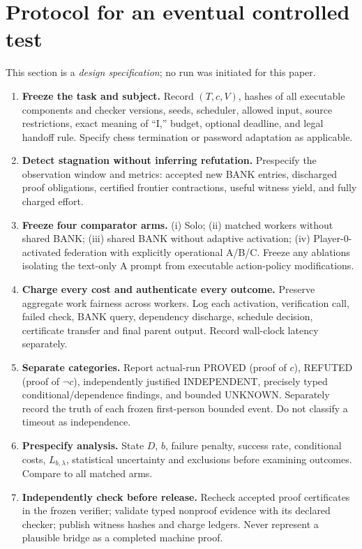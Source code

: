 \documentclass[11pt,letterpaper]{article}
\theoremstyle{remark}
\begin{document}
\section{Protocol for an eventual controlled test}
This section is a \emph{design specification}; no run was initiated for this paper.
\begin{enumerate}
\item \textbf{Freeze the task and subject.} Record $(T,c,V)$, hashes of all executable components and checker versions, seeds, scheduler, allowed input, source restrictions, exact meaning of ``I,'' budget, optional deadline, and legal handoff rule. Specify chess termination or password adaptation as applicable.
\item \textbf{Detect stagnation without inferring refutation.} Prespecify the observation window and metrics: accepted new BANK entries, discharged proof obligations, certified frontier contractions, useful witness yield, and fully charged effort.
\item \textbf{Freeze four comparator arms.} (i) Solo; (ii) matched workers without shared BANK; (iii) shared BANK without adaptive activation; (iv) Player-0-activated federation with explicitly operational A/B/C. Freeze any ablations isolating the text-only A prompt from executable action-policy modifications.
\item \textbf{Charge every cost and authenticate every outcome.} Preserve aggregate work fairness across workers. Log each activation, verification call, failed check, BANK query, dependency discharge, schedule decision, certificate transfer and final parent output. Record wall-clock latency separately.
\item \textbf{Separate categories.} Report actual-run PROVED (proof of $c$), REFUTED (proof of $\neg c$), independently justified INDEPENDENT, precisely typed conditional/dependence findings, and bounded UNKNOWN. Separately record the truth of each frozen first-person bounded event. Do not classify a timeout as independence.
\item \textbf{Prespecify analysis.} State $D$, $b$, failure penalty, success rate, conditional costs, $L_{b,\lambda}$, statistical uncertainty and exclusions before examining outcomes. Compare to all matched arms.
\item \textbf{Independently check before release.} Recheck accepted proof certificates in the frozen verifier; validate typed nonproof evidence with its declared checker; publish witness hashes and charge ledgers. Never represent a plausible bridge as a completed machine proof.
\end{enumerate}
\end{document}
